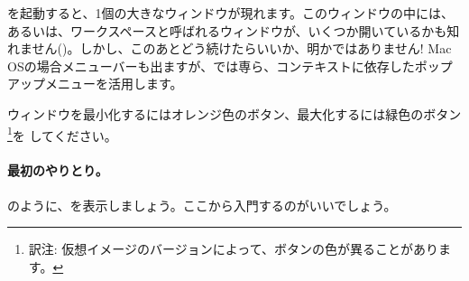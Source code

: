 \documentclass[a4paper,10pt,twoside]{book}
\begin{document}
\pharo を起動すると、1個の大きなウィンドウが現れます。このウィンドウの中には、あるいは、ワークスペースと呼ばれるウィンドウが、いくつか開いているかも知れません()。しかし、このあとどう続けたらいいか、明かではありません!
Mac OSの場合メニューバーも出ますが、\pharo では専ら、コンテキストに依存したポップアップメニューを活用します。


ウィンドウを最小化するにはオレンジ色のボタン、最大化するには緑色のボタン\footnote{訳注: 仮想イメージのバージョンによって、ボタンの色が異ることがあります。}を \click してください。

\paragraph{最初のやりとり。}

のように、を表示しましょう。ここから入門するのがいいでしょう。


\end{document}
